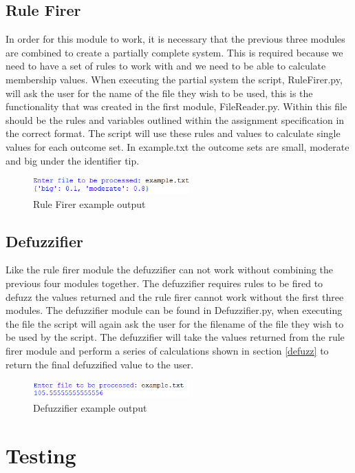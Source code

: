 \documentclass{article}
\begin{document}
\subsection{Rule Firer}
In order for this module to work, it is necessary that the previous three modules are combined to create a partially complete system. This is required because we need to have a set of rules to work with and we need to be able to calculate membership values. When executing the partial system the script, RuleFirer.py, will ask the user for the name of the file they wish to be used, this is the functionality that was created in the first module, FileReader.py. Within this file should be the rules and variables outlined within the assignment specification in the correct format. The script will use these rules and values to calculate single values for each outcome set. In example.txt the outcome sets are small, moderate and big under the identifier tip.

\begin{figure}[H]
\centering
\includegraphics[width=6cm]{example4}
\caption{Rule Firer example output}
\end{figure}

\subsection{Defuzzifier}
Like the rule firer module the defuzzifier can not work without combining the previous four modules together. The defuzzifier requires rules to be fired to defuzz the values returned and the rule firer cannot work without the first three modules. The defuzzifier module can be found in Defuzzifier.py, when executing the file the script will again ask the user for the filename of the file they wish to be used by the script. The defuzzifier will take the values returned from the rule firer module and perform a series of calculations shown  in section \ref{defuzz} to return the final defuzzified value to the user.

\begin{figure}[H]
\centering
\includegraphics[width=6cm]{example5}
\caption{Defuzzifier example output}
\end{figure}

\section{Testing}
\end{document}
